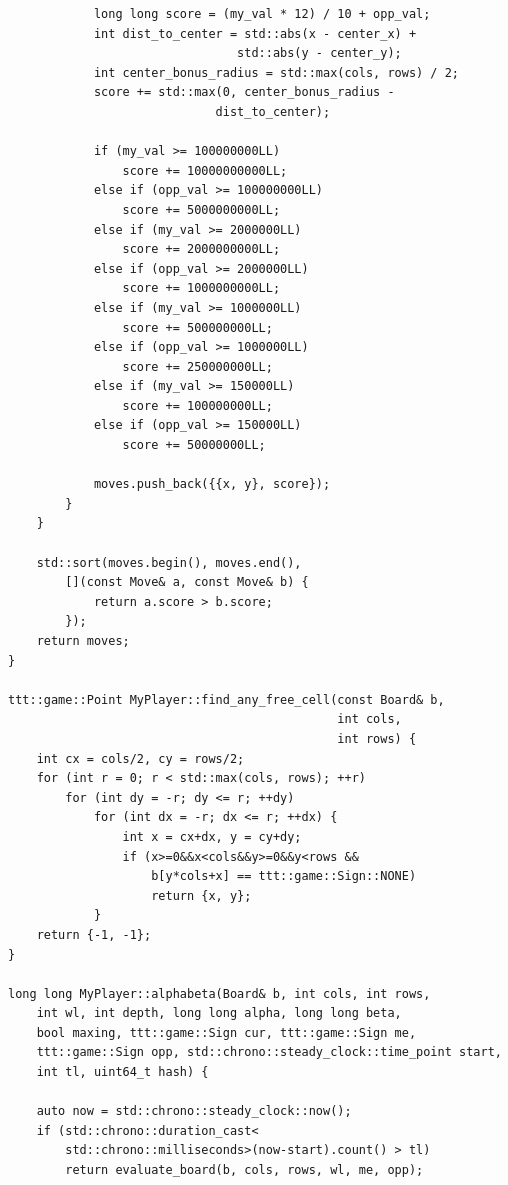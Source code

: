 \documentclass[a4paper,14pt]{extreport}
\begin{document}
\begin{lstlisting}
            long long score = (my_val * 12) / 10 + opp_val; 
            int dist_to_center = std::abs(x - center_x) + 
                                std::abs(y - center_y);
            int center_bonus_radius = std::max(cols, rows) / 2; 
            score += std::max(0, center_bonus_radius - 
                             dist_to_center); 
            
            if (my_val >= 100000000LL) 
                score += 10000000000LL;       
            else if (opp_val >= 100000000LL) 
                score += 5000000000LL;  
            else if (my_val >= 2000000LL) 
                score += 2000000000LL;     
            else if (opp_val >= 2000000LL) 
                score += 1000000000LL;    
            else if (my_val >= 1000000LL) 
                score += 500000000LL;      
            else if (opp_val >= 1000000LL) 
                score += 250000000LL;     
            else if (my_val >= 150000LL) 
                score += 100000000LL;       
            else if (opp_val >= 150000LL) 
                score += 50000000LL;       
            
            moves.push_back({{x, y}, score});
        }
    }
    
    std::sort(moves.begin(), moves.end(), 
        [](const Move& a, const Move& b) { 
            return a.score > b.score; 
        });
    return moves;
}

ttt::game::Point MyPlayer::find_any_free_cell(const Board& b, 
                                              int cols, 
                                              int rows) {
    int cx = cols/2, cy = rows/2;
    for (int r = 0; r < std::max(cols, rows); ++r)
        for (int dy = -r; dy <= r; ++dy)
            for (int dx = -r; dx <= r; ++dx) {
                int x = cx+dx, y = cy+dy;
                if (x>=0&&x<cols&&y>=0&&y<rows && 
                    b[y*cols+x] == ttt::game::Sign::NONE) 
                    return {x, y};
            }
    return {-1, -1};
}

long long MyPlayer::alphabeta(Board& b, int cols, int rows, 
    int wl, int depth, long long alpha, long long beta, 
    bool maxing, ttt::game::Sign cur, ttt::game::Sign me, 
    ttt::game::Sign opp, std::chrono::steady_clock::time_point start, 
    int tl, uint64_t hash) {
    
    auto now = std::chrono::steady_clock::now();
    if (std::chrono::duration_cast<
        std::chrono::milliseconds>(now-start).count() > tl) 
        return evaluate_board(b, cols, rows, wl, me, opp);
    

\end{lstlisting}
\end{document}
